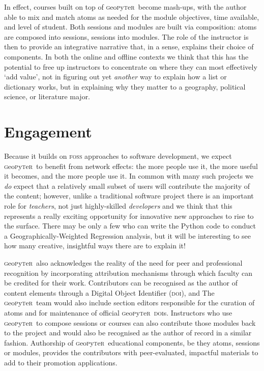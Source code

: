 \documentclass[letter, 11pt,titlepage]{article}
\newcommand{\gp}{\textsc{g}eo\textsc{p}y\textsc{t}e\textsc{r}~\/}
\begin{document}
In effect, courses built on top of \gp become mash-ups, with the author able to
mix and match atoms as needed for the module objectives, time available, and
level of student. Both sessions and modules are built via composition: atoms are
composed into sessions, sessions into modules. The role of the instructor is
then to provide an integrative narrative that, in a sense, explains their choice
of components. In both the online and offline contexts we think that this has
the potential to free up instructors to concentrate on where they can most
effectively `add value', not in figuring out yet \emph{another} way to explain
how a list or dictionary works, but in explaining why they matter to a
geography, political science, or literature major.

\section{Engagement}\label{engagement}

Because it builds on \textsc{foss} approaches to software development, we expect
\gp to benefit from network effects: the more people use it, the more useful it
becomes, and the more people use it. In common with many such projects we
\emph{do} expect that a relatively small subset of users will contribute the
majority of the content; however, unlike a traditional software project there is
an important role for \emph{teachers}, not just highly-skilled \emph{developers}
and we think that this represents a really exciting opportunity for innovative
new approaches to rise to the surface. There may be only a few who can write the
Python code to conduct a Geographically-Weighted Regression analysis, but it
will be interesting to see how many creative, insightful ways there are to
explain it!

\gp also acknowledges the reality of the need for peer and professional
recognition by incorporating attribution mechanisms through which faculty can be
credited for their work. Contributors can be recognised as the author of content
elements through a Digital Object Identifier (\textsc{doi}), and The \gp team
would also include section editors responsible for the curation of atoms and for
maintenance of official \gp \textsc{doi}s. Instructors who use \gp to compose
sessions or courses can also contribute those modules back to the project and
would also be recognised as the author of record in a similar fashion.
Authorship of \gp educational components, be they atoms, sessions or modules,
provides the contributors with peer-evaluated, impactful materials to add to
their promotion applications.
\end{document}
